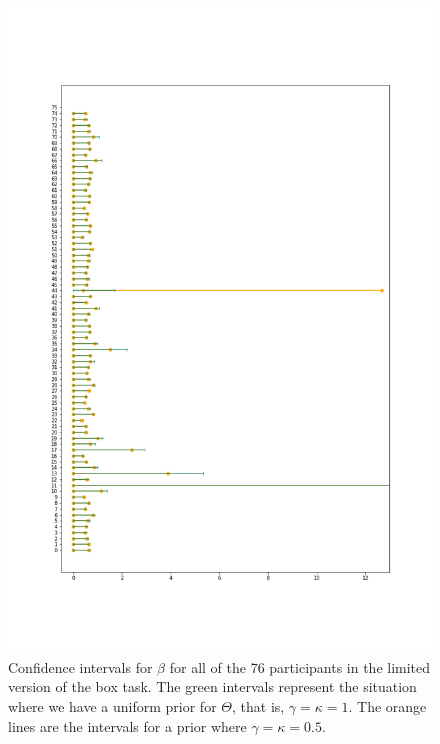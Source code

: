 \begin{figure}
    \centering
    \includegraphics[scale=0.37]{pictures/Sensitivity/ci_lim_beta_zoom1.png}
    \caption[CIs for $\beta$ for all participants with two different priors, limited]{Confidence intervals for $\beta$ for all of the 76 participants in the limited version of the box task. The green intervals represent the situation where we have a uniform prior for $\Theta$, that is, $\gamma=\kappa=1$. The orange lines are the intervals for a prior where $\gamma=\kappa=0.5$.}
    \label{fig:sensitivity_ci_lim_beta_zoom}
\end{figure}

